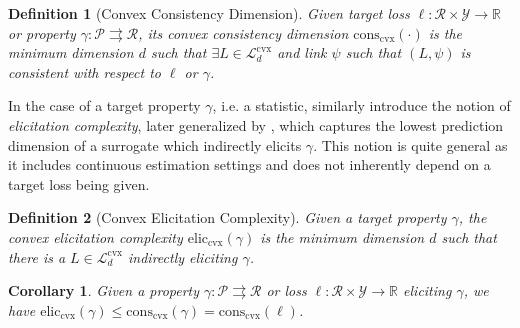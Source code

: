 \documentclass[11pt]{article} %
\newcommand{\Comments}{1}
\newcommand{\mytodo}[2]{\ifnum\Comments=1%
	\todo[linecolor=#1!80!black,backgroundcolor=#1,bordercolor=#1!80!black]{#2}\fi}
\newcommand{\jessiet}[1]{\mytodo{purple!20!white}{JF: #1}}
\newcommand{\btw}[1]{}%
\newcommand{\reals}{\mathbb{R}}
\newcommand{\eliccvx}{\mathrm{elic}_\mathrm{cvx}}
\newcommand{\conscvx}{\mathrm{cons}_\mathrm{cvx}}
\newcommand{\Lcvx}{\mathcal{L}^{\mathrm{cvx}}}
\newcommand{\R}{\mathcal{R}}
\renewcommand{\P}{\mathcal{P}}
\newcommand{\Y}{\mathcal{Y}}
\newcommand{\toto}{\rightrightarrows}
\newtheorem{corollary}{Corollary}
\newtheorem{definition}{Definition}
\begin{document}
\begin{definition}[Convex Consistency Dimension]\label{def:cvx-consistency-dim}
  Given target loss $\ell:\R \times\Y \to \reals$ or property $\gamma: \P \toto \R$, its \emph{convex consistency dimension} $\conscvx(\cdot)$ is the minimum dimension $d$ such that $\exists L \in \Lcvx_d$ and link $\psi$ such that $(L,\psi)$ is consistent with respect to $\ell$ or $\gamma$.
\end{definition}

In the case of a target property $\gamma$, i.e. a statistic, \citet{lambert2008eliciting} similarly introduce the notion of \emph{elicitation complexity}, later generalized by \citet{frongillo2020elicitation}, which captures the lowest prediction dimension of a surrogate which indirectly elicits $\gamma$.
This notion is quite general as it includes continuous estimation settings and does not inherently depend on a target loss being given. 

\begin{definition}[Convex Elicitation Complexity]\label{def:cvx-elic-complex}
	Given a target property $\gamma$, the \emph{convex elicitation complexity} $\eliccvx(\gamma)$ is the minimum dimension $d$ such that there is a $L \in \Lcvx_d$ indirectly eliciting $\gamma$.
\end{definition}

\begin{corollary}\label{cor:elic-lb-consis-dim}
	Given a property $\gamma : \P \toto \R$ or loss $\ell:\R \times \Y \to \reals$ eliciting $\gamma$, we have $\eliccvx(\gamma) \leq \conscvx(\gamma) = \conscvx(\ell)$.
\end{corollary}

\end{document}
